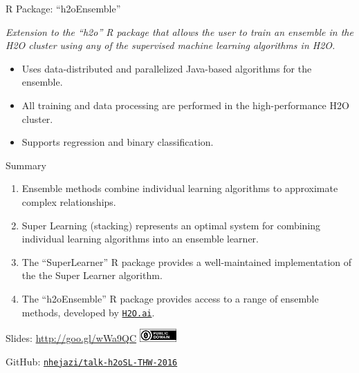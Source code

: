 \documentclass[12pt,t]{beamer}
\begin{document}
\begin{frame}{R Package: ``h2oEnsemble''}

\vspace*{3mm}

\centering

\textit{Extension to the ``h2o'' R package that allows the user to train an
ensemble in the H2O cluster using any of the supervised machine learning
algorithms in H2O.}

\vspace{1em}

  \begin{itemize}
    \itemsep12pt
    \item Uses data-distributed and parallelized Java-based algorithms for the
          ensemble.
    \item All training and data processing are performed in the
          high-performance H2O cluster.
    \item Supports regression and binary classification.
  \end{itemize}

\note{
}
\end{frame}


\begin{frame}[c]{Summary}

  \begin{enumerate}
  \itemsep12pt
    \item Ensemble methods combine individual learning algorithms to approximate
          complex relationships.
    \item Super Learning (stacking) represents an optimal system for combining
          individual learning algorithms into an ensemble learner.
    \item The ``SuperLearner'' R package provides a well-maintained
          implementation of the the Super Learner algorithm.
    \item The ``h2oEnsemble'' R package provides access to a range of ensemble
          methods, developed by \href{http://www.h2o.ai}{\tt H2O.ai}.
  \end{enumerate}

\end{frame}


\begin{frame}[c]{}

\Large

Slides: \url{http://goo.gl/wWa9QC} \quad
\includegraphics[height=5mm]{cc-zero.png}

\vspace{15mm}

GitHub: \href{https://github.com/nhejazi/talk-h2oSL-THW-2016}
{\tt nhejazi/talk-h2oSL-THW-2016}

\end{frame}
\end{document}

